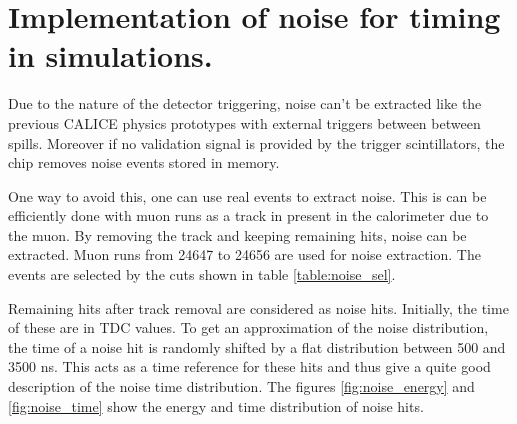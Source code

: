\chapter{Implementation of noise for timing in simulations.}
\label{appendix:noise}

Due to the nature of the detector triggering, noise can't be extracted like the previous CALICE physics prototypes with external triggers between between spills. Moreover if no validation signal is provided by the trigger scintillators, the chip removes noise events stored in memory.

One way to avoid this, one can use real events to extract noise. This is can be efficiently done with muon runs as a track in present in the calorimeter due to the muon. By removing the track and keeping remaining hits, noise can be extracted. Muon runs from 24647 to 24656 are used for noise extraction. The events are selected by the cuts shown in table \ref{table:noise_sel}.

\begin{table}[htb!]
	\centering
	\caption{Selection cuts for noise extraction from muon runs.}
	\label{table:noise_sel}
\end{table}

Remaining hits after track removal are considered as noise hits. Initially, the time of these are in TDC values. To get an approximation of the noise distribution, the time of a noise hit is randomly shifted by a flat distribution between 500 and 3500 ns. This acts as a time reference for these hits and thus give a quite good description of the noise time distribution. The figures \ref{fig:noise_energy} and \ref{fig:noise_time} show the energy and time distribution of noise hits.

